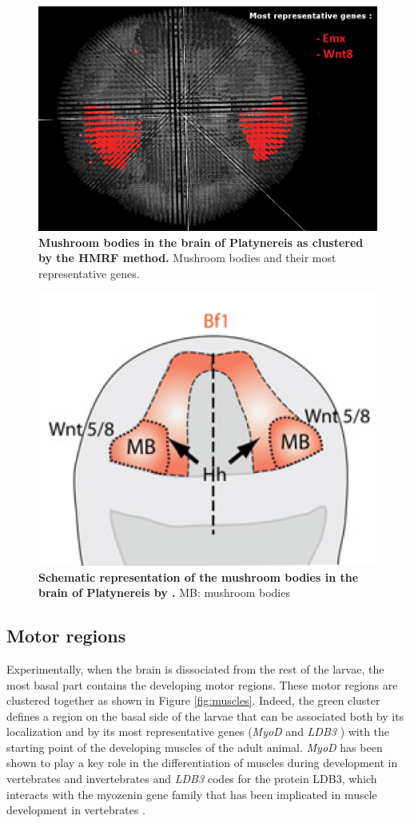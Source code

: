 	\begin{figure}[H]
\centerline{\includegraphics[width=0.8\linewidth]{gfx/chapter6/mush.png}}
\caption{{\bf Mushroom bodies in the brain of Platynereis as clustered by the HMRF method.} Mushroom bodies and their most representative genes.}
\label{fig:validmush}
	\end{figure}
	
	\begin{figure}[H]
\centerline{\includegraphics[width=0.6\linewidth]{gfx/chapter6/mush_tomer.png}}
\caption{{\bf Schematic representation of the mushroom bodies in the brain of Platynereis by \citep{Tomer10}.} MB: mushroom bodies}
\label{fig:validmushtom}
	\end{figure}
		\subsection{Motor regions}
		Experimentally, when the brain is dissociated from the rest of the larvae, the most basal part contains the developing motor regions. These motor regions are clustered together as shown in Figure \ref{fig:muscles}. Indeed, the green cluster defines a region on the basal side of the larvae that can be associated both by its localization and by its most representative genes ({\it{MyoD}} \citep{weintraub91,michelson90} and {\it{LDB3}} \citep{krcmery10,marziliano07}) with the starting point of the developing muscles of the adult animal. {\it{MyoD}} has been shown to play a key role in the differentiation of muscles during development in vertebrates and invertebrates \citep{weintraub91,michelson90} and {\it{LDB3}} codes for the protein LDB3, which interacts with the myozenin gene family that has been implicated in muscle development in vertebrates \citep{marziliano07}.\\
		
